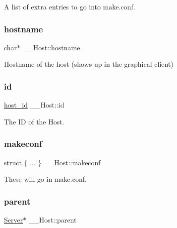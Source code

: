 A list of extra entries to go into make.\+conf. 

\mbox{\label{struct_____host_a3fdd5a6a4e8dc35d72067996674c9ac5}} 
\subsubsection{\texorpdfstring{hostname}{hostname}}
{\footnotesize\ttfamily char$\ast$ \+\_\+\+\_\+\+Host\+::hostname}



Hostname of the host (shows up in the graphical client) 

\mbox{\label{struct_____host_a2101a62a3859aa1106a2722c659f93c6}} 
\subsubsection{\texorpdfstring{id}{id}}
{\footnotesize\ttfamily \mbox{\hyperlink{host_8h_ad9a5413d8b4376a70706368c97972c2b}{host\+\_\+id}} \+\_\+\+\_\+\+Host\+::id}



The ID of the Host. 

\mbox{\label{struct_____host_a5dbb399641e9722e0250871091751972}} 
\subsubsection{\texorpdfstring{makeconf}{makeconf}}
{\footnotesize\ttfamily struct \{ ... \}   \+\_\+\+\_\+\+Host\+::makeconf}



These will go in make.\+conf. 

\mbox{\label{struct_____host_ac050615c8d9d8da7d2cfaffaafd9473d}} 
\subsubsection{\texorpdfstring{parent}{parent}}
{\footnotesize\ttfamily \mbox{\hyperlink{server_8h_a705d964b8a67edeeb3943273a397e4c2}{Server}}$\ast$ \+\_\+\+\_\+\+Host\+::parent}



